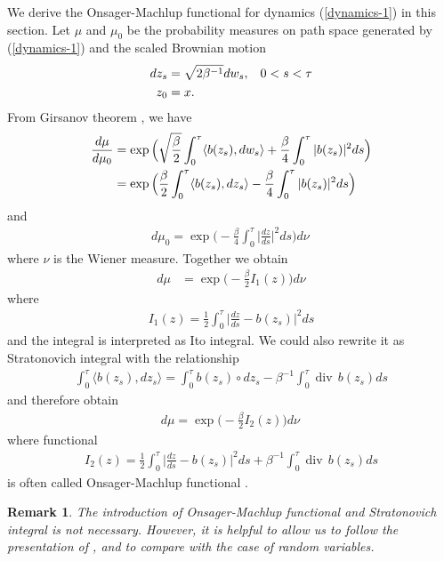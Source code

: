 \documentclass[final]{siamltex}
\newtheorem{remark}{Remark}
\begin{document}
We derive the Onsager-Machlup functional for dynamics (\ref{dynamics-1}) in
this section.
Let $\mu$ and $\mu_0$ be the probability measures on path space generated by
(\ref{dynamics-1}) and the scaled Brownian motion
\begin{align}
  \begin{split}
  dz_s &= \sqrt{2\beta^{-1}}dw_s, \hspace{3mm} 0 < s < \tau \\
   z_0 &= x .
  \end{split}
\end{align}
From Girsanov theorem \cite{oksendalSDE}, we have 
\begin{align}
  \frac{d\mu}{d\mu_0} &= \exp\Big(\sqrt{\frac{\beta}{2}}\int_0^\tau
  \langle b(z_s), dw_s\rangle + \frac{\beta}{4}\int_0^\tau |b(z_s)|^2ds\Big) \notag\\
  &=\exp\Big(\frac{\beta}{2}\int_0^\tau \langle b(z_s),dz_s\rangle -
  \frac{\beta}{4}\int_0^\tau |b(z_s)|^2ds\Big) 
\end{align}
and
\begin{align}
  d\mu_0 = \exp\Big(-\frac{\beta}{4}\int_0^\tau
  \Big|\frac{dz}{ds}\Big|^2ds\Big) d\nu\,
\end{align}
where $\nu$ is the Wiener measure. Together we obtain
\begin{align}
  d\mu &=\exp\Big(-\frac{\beta}{2} I_{1}(z)\Big)d\nu
  \label{measure-1}
\end{align}
where
\begin{align}
  I_{1}(z) = \frac{1}{2}\int_0^\tau \Big|\frac{dz}{ds} - b(z_s)\Big|^2 ds
\end{align}
and the integral is interpreted as Ito integral.
We could also rewrite it as Stratonovich integral with the relationship
\begin{align}
  \int_0^\tau \langle b(z_s), dz_s\rangle = \int_0^\tau b(z_s) \circ dz_s - \beta^{-1} \int_0^\tau \operatorname{div}\,b(z_s) ds
\end{align}
and therefore obtain 
\begin{align}
  d\mu = \exp \Big(-\frac{\beta}{2} I_2(z) \Big) d\nu\,
\end{align}
where functional 
\begin{align}
  I_2(z) = \frac{1}{2}\int_0^\tau \Big|\frac{dz}{ds}- b(z_s)\Big|^2 ds +
  \beta^{-1} \int_0^\tau \operatorname{div}\,b(z_s) ds
  \label{om-fun}
\end{align}
is often called Onsager-Machlup functional \cite{om1978, om_functional_pinski}. 
\begin{remark}
  The introduction of Onsager-Machlup functional and Stratonovich integral is
  not necessary. However, it is helpful to allow us to follow the presentation of
  \cite{ce_tutorial}, \cite{ce_book} and to compare with the case of random
  variables.
\end{remark}
\end{document}
